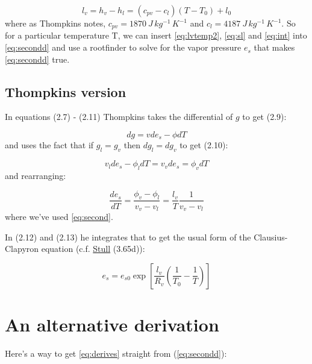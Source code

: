 \documentclass[12pt]{article}
\begin{document}
\begin{equation}
  \label{eq:lvtemp2}
  l_v = h_v - h_l = (c_{pv} - c_l) (T - T_0) + l_0
\end{equation}
where as Thompkins notes, $c_{pv} = 1870\ J\,kg^{-1}\,K^{-1}$ and $c_l=4187\ J\,kg^{-1}\,K^{-1}$.  So for a particular temperature T,
we can insert \eqref{eq:lvtemp2},  \eqref{eq:sl} and \eqref{eq:int} into \eqref{eq:secondd} 
and use a rootfinder to solve for the vapor pressure $e_s$ that makes \eqref{eq:secondd} true.


\subsection{Thompkins version}
\label{sec:thompkins-version}

In equations (2.7) - (2.11) Thompkins takes the differential of $g$ to get (2.9):

\begin{equation}
  \label{eq:diffg}
  dg = v de_s - \phi dT
\end{equation}
and uses the fact that if $g_l = g_v$ then $dg_l = dg_v$ to get (2.10):

\begin{equation}
  \label{eq:dgvequal}
  v_l de_s - \phi_l dT = v_v de_s = \phi_v dT
\end{equation}
and rearranging:

\begin{equation}
  \label{eq:derives}
  \frac{de_s}{dT} = \frac{\phi_v - \phi_l}{v_v - v_l} = \frac{l_v}{T} \frac{1}{v_v -v_l}
\end{equation}
where we've used \eqref{eq:second}.

In (2.12) and (2.13) he integrates that to get the usual form of the Clausius-Clapyron equation (c.f. 
\href{https://www.eoas.ubc.ca/books/Practical_Meteorology}%
{Stull} (3.65d)):

\begin{equation}
  \label{eq:ccfinal}
  e_s = e_{s0} \exp \left [ \frac{l_v}{R_v} \left ( \frac{1}{T_0} - \frac{1}{T} \right ) \right ]
\end{equation}

\section{An alternative derivation}
\label{sec:entropy-mixture}

Here's a way to get \eqref{eq:derives} straight from (\ref{eq:secondd}):
\end{document}
